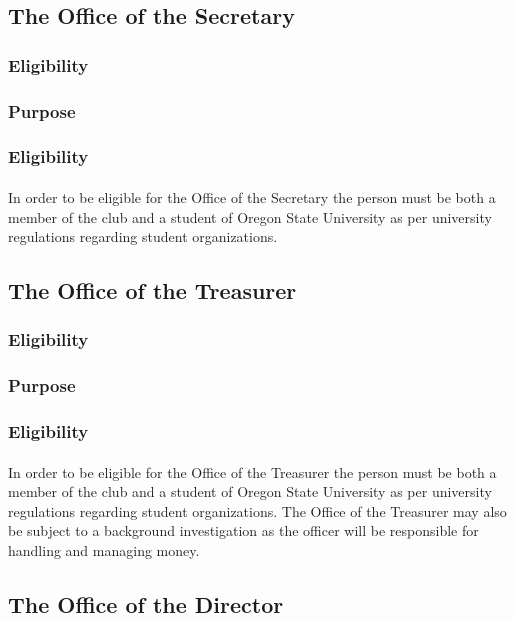 \documentclass[12pt]{article}
\begin{document}
\subsection{The Office of the Secretary}
\subsubsection{Eligibility}
\subsubsection{Purpose}
\subsubsection{Eligibility}
\paragraph{}
In order to be eligible for the Office of the Secretary the person must be both a member of the club and a student of Oregon State University as per university regulations regarding student organizations.

\subsection{The Office of the Treasurer}
\subsubsection{Eligibility}
\subsubsection{Purpose}
\subsubsection{Eligibility}
\paragraph{}
In order to be eligible for the Office of the Treasurer the person must be both a member of the club and a student of Oregon State University as per university regulations regarding student organizations.
The Office of the Treasurer may also be subject to a background investigation as the officer will be responsible for handling and managing money.

\subsection{The Office of the Director}
\end{document}
